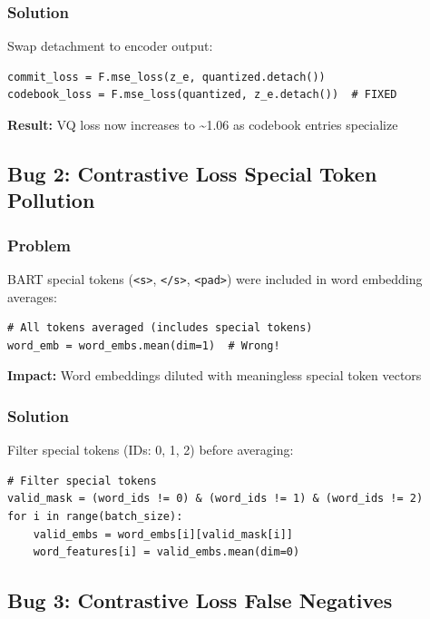 \documentclass[12pt,a4paper]{article}
\begin{document}
\subsubsection{Solution}
Swap detachment to encoder output:

\begin{lstlisting}[caption=Fixed Code]
commit_loss = F.mse_loss(z_e, quantized.detach())
codebook_loss = F.mse_loss(quantized, z_e.detach())  # FIXED
\end{lstlisting}

\textbf{Result:} VQ loss now increases to \textasciitilde1.06 as codebook entries specialize

\subsection{Bug 2: Contrastive Loss Special Token Pollution}

\subsubsection{Problem}
BART special tokens (\texttt{\textless s\textgreater}, \texttt{\textless /s\textgreater}, \texttt{\textless pad\textgreater}) were included in word embedding averages:

\begin{lstlisting}[caption=Original Code (Buggy)]
# All tokens averaged (includes special tokens)
word_emb = word_embs.mean(dim=1)  # Wrong!
\end{lstlisting}

\textbf{Impact:} Word embeddings diluted with meaningless special token vectors

\subsubsection{Solution}
Filter special tokens (IDs: 0, 1, 2) before averaging:

\begin{lstlisting}[caption=Fixed Code]
# Filter special tokens
valid_mask = (word_ids != 0) & (word_ids != 1) & (word_ids != 2)
for i in range(batch_size):
    valid_embs = word_embs[i][valid_mask[i]]
    word_features[i] = valid_embs.mean(dim=0)
\end{lstlisting}

\subsection{Bug 3: Contrastive Loss False Negatives}
\end{document}
